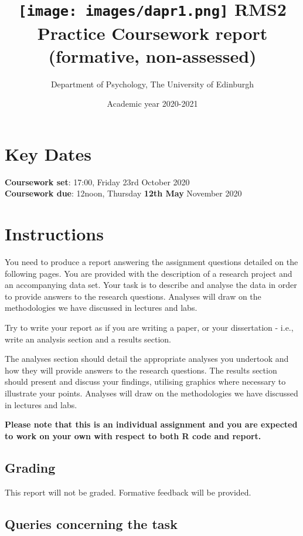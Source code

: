 \documentclass[
]{article}
\title{\texttt{[image: images/dapr1.png]}
\protect \linebreak RMS2 \protect \linebreak Practice Coursework report
(formative, non-assessed)}
\subtitle{Department of Psychology, The University of Edinburgh}
\author{}
\date{\vspace{-2.5em}Academic year 2020-2021}
\begin{document}
\maketitle

\hypertarget{key-dates}{%
\section{Key Dates}\label{key-dates}}

\textbf{Coursework set}: 17:00, Friday 23rd October 2020\\
\textbf{Coursework due}: 12noon, Thursday \textbf{12th May} November
2020

\hypertarget{instructions}{%
\section{Instructions}\label{instructions}}

You need to produce a report answering the assignment questions detailed
on the following pages. You are provided with the description of a
research project and an accompanying data set. Your task is to describe
and analyse the data in order to provide answers to the research
questions. Analyses will draw on the methodologies we have discussed in
lectures and labs.

Try to write your report as if you are writing a paper, or your
dissertation - i.e., write an analysis section and a results section.

The analyses section should detail the appropriate analyses you
undertook and how they will provide answers to the research questions.
The results section should present and discuss your findings, utilising
graphics where necessary to illustrate your points. Analyses will draw
on the methodologies we have discussed in lectures and labs.

\textbf{Please note that this is an individual assignment and you are
expected to work on your own with respect to both R code and report.}

\hypertarget{grading}{%
\subsection{Grading}\label{grading}}

This report will not be graded. Formative feedback will be provided.

\hypertarget{queries-concerning-the-task}{%
\subsection{Queries concerning the
task}\label{queries-concerning-the-task}}
\end{document}
